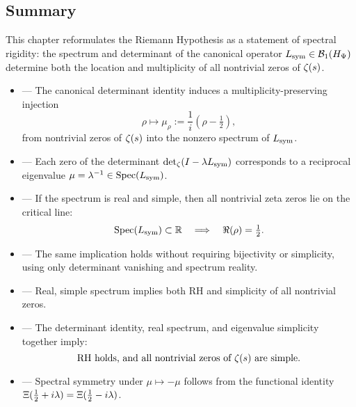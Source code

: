 \subsection*{Summary}

This chapter reformulates the Riemann Hypothesis as a statement of spectral rigidity: the spectrum and determinant of the canonical operator \( L_{\mathrm{sym}} \in \mathcal{B}_1(H_{\Psi}) \) determine both the location and multiplicity of all nontrivial zeros of \( \zeta(s) \).

\begin{itemize}
  \item {} — The canonical determinant identity induces a multiplicity-preserving injection
  \[
  \rho \mapsto \mu_\rho := \frac{1}{i}(\rho - \tfrac{1}{2}),
  \]
  from nontrivial zeros of \( \zeta(s) \) into the nonzero spectrum of \( L_{\mathrm{sym}} \).

  \item {} — Each zero of the determinant \( \det\nolimits_\zeta(I - \lambda L_{\mathrm{sym}}) \) corresponds to a reciprocal eigenvalue \( \mu = \lambda^{-1} \in \operatorname{Spec}(L_{\mathrm{sym}}) \).

  \item {} — If the spectrum is real and simple, then all nontrivial zeta zeros lie on the critical line:
  \[
  \operatorname{Spec}(L_{\mathrm{sym}}) \subset \mathbb{R} \quad \Longrightarrow \quad \Re(\rho) = \tfrac{1}{2}.
  \]

  \item {} — The same implication holds without requiring bijectivity or simplicity, using only determinant vanishing and spectrum reality.

  \item {} — Real, simple spectrum implies both RH and simplicity of all nontrivial zeros.

  \item {} — The determinant identity, real spectrum, and eigenvalue simplicity together imply:
  \[
  \text{RH holds, and all nontrivial zeros of } \zeta(s) \text{ are simple.}
  \]

  \item {} — Spectral symmetry under \( \mu \mapsto -\mu \) follows from the functional identity \( \Xi(\tfrac{1}{2} + i\lambda) = \Xi(\tfrac{1}{2} - i\lambda) \).


\end{itemize}
